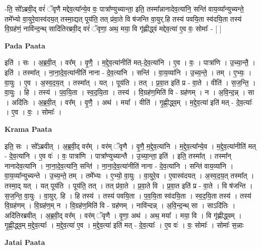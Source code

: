 \documentclass[17pt]{extarticle}
\begin{document}
-ति॒ सो᳚ऽब्रवी॒द् वरं॑ ॅवृणै मद्देव॒त्या᳚न्ये॒व वः॒ पात्रा᳚ण्युच्यान्ता॒ इति॒ तस्मा᳚न्नानादेव॒त्या॑नि॒ सन्ति॑ वाय॒व्या᳚न्युच्यन्ते॒ तमे᳚भ्यो वा॒युरे॒वास्व॑दय॒त् तस्मा॒द्यत् पूय॑ति॒ तत् प्र॑वा॒ते वि ष॑जन्ति वा॒युर्.हि तस्य॑ पवयि॒ता स्व॑दयि॒ता तस्य॑ वि॒ग्रह॑णं॒ नावि॑न्द॒न्थ् सादि॑तिरब्रवी॒द् वरं॑ ॅवृणा॒ अथ॒ मया॒ वि गृ॑ह्णीद्ध्वं मद्देव॒त्या॑ ए॒व वः॒ सोमाः᳚ - [  ] \newline

\textbf{Pada Paata} \newline

इति॑ । सः । अ॒ब्र॒वी॒त् । वर᳚म् । वृ॒णै॒ । म॒द्दे॒व॒त्या॑नीति॑ मत्-दे॒व॒त्या॑नि । ए॒व । वः॒ । पात्रा॑णि । उ॒च्या॒न्तै॒ । इति॑ । तस्मा᳚त् । ना॒ना॒दे॒व॒त्या॑नीति॑ नाना - दे॒व॒त्या॑नि । सन्ति॑ । वा॒य॒व्या॑नि । उ॒च्य॒न्ते॒ । तम् । ए॒भ्यः॒ । वा॒युः । ए॒व । अ॒स्व॒द॒य॒त् । तस्मा᳚त् । यत् । पूय॑ति । तत् । प्र॒वा॒त इति॑ प्र - वा॒ते । वीति॑ । स॒ज॒न्ति॒ । वा॒युः । हि । तस्य॑ । प॒व॒यि॒ता । स्व॒द॒यि॒ता । तस्य॑ । वि॒ग्रह॑ण॒मिति॑ वि - ग्रह॑णम् । न । अ॒वि॒न्द॒न्न् । सा । अदि॑तिः । अ॒ब्र॒वी॒त् । वर᳚म् । वृ॒णै॒ । अथ॑ । मया᳚ । वीति॑ । गृ॒ह्णी॒द्ध्व॒म् । म॒द्दे॒व॒त्या॑ इति॑ मत् - दे॒व॒त्याः᳚ । ए॒व । वः॒ । सोमाः᳚ ।  \newline


\textbf{Krama Paata} \newline

इति॒ सः । सो᳚ऽब्रवीत् । अ॒ब्र॒वी॒द् वर᳚म् । वर॑म् ॅवृणै । वृ॒णै॒ म॒द्दे॒व॒त्या॑नि । म॒द्दे॒व॒त्या᳚न्ये॒व । म॒द्दे॒व॒त्या॑नीति॑ मत् - दे॒व॒त्या॑नि । ए॒व वः॑ । वः॒ पात्रा॑णि । पात्रा᳚ण्युच्यान्तै । उ॒च्या॒न्ता॒ इति॑ । इति॒ तस्मा᳚त् । तस्मा᳚न् नानादेव॒त्या॑नि । ना॒ना॒दे॒व॒त्या॑नि॒ सन्ति॑ । ना॒ना॒दे॒व॒त्या॑नीति॑ नाना - दे॒व॒त्या॑नि । सन्ति॑ वाय॒व्या॑नि । वा॒य॒व्या᳚न्युच्यन्ते । उ॒च्य॒न्ते॒ तम् । तमे᳚भ्यः । ए॒भ्यो॒ वा॒युः । वा॒युरे॒व । ए॒वास्व॑दयत् । अ॒स्व॒द॒य॒त् तस्मा᳚त् । तस्मा॒द् यत् । यत् पूय॑ति । पूय॑ति॒ तत् । तत् प्र॑वा॒ते । प्र॒वा॒ते वि । प्र॒वा॒त इति॑ प्र - वा॒ते । वि ष॑जन्ति । स॒ज॒न्ति॒ वा॒युः । वा॒युर्. हि । हि तस्य॑ । तस्य॑ पवयि॒ता । प॒व॒यि॒ता स्व॑दयि॒ता । स्व॒द॒यि॒ता तस्य॑ । तस्य॑ वि॒ग्रह॑णम् । वि॒ग्रह॑ण॒म् न । वि॒ग्रह॑ण॒मिति॑ वि - ग्रह॑णम् । नावि॑न्दन्न् । अ॒वि॒न्द॒न्थ् सा । साऽदि॑तिः । अदि॑तिरब्रवीत् । अ॒ब्र॒वी॒द् वर᳚म् । वर॑म् ॅवृणै । वृ॒णा॒ अथ॑ । अथ॒ मया᳚ । मया॒ वि । वि गृ॑ह्णीद्ध्वम् । गृ॒ह्णी॒द्ध्व॒म् म॒द्दे॒व॒त्याः᳚ । म॒द्दे॒व॒त्या॑ ए॒व । म॒द्दे॒व॒त्या॑ इति॑ मत् - दे॒व॒त्याः᳚ । ए॒व वः॑ । वः॒ सोमाः᳚ । सोमाः᳚ स॒न्नाः \newline

\textbf{Jatai Paata} \newline
\end{document}
